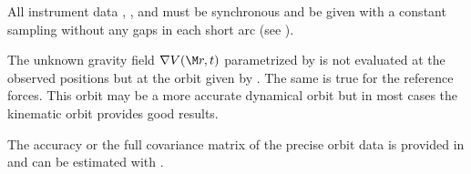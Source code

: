 All instrument data , ,
and  must be synchronous and be given
with a constant sampling without any gaps in each short arc (see ).

The unknown gravity field $\nabla V(\M r, t)$ parametrized by 
is not evaluated at the observed positions but at the orbit given by .
The same is true for the reference forces. This orbit may be a more accurate dynamical orbit but
in most cases the kinematic orbit provides good results.

The accuracy or the full covariance matrix of the precise orbit data is provided in
 and can be estimated with .


